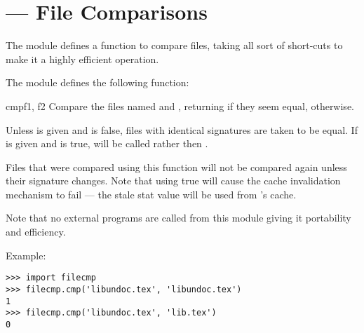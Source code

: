 \section{ ---
         File Comparisons}


The  module defines a function to compare files, taking all
sort of short-cuts to make it a highly efficient operation.

The  module defines the following function:

\begin{funcdesc}{cmp}{f1, f2}
Compare the files named  and , returning 
if they seem equal,  otherwise.

Unless  is given and is false, files with identical
 signatures are taken to be equal. If
 is given and is true,
 will be called rather then .

Files that were compared using this function will not be compared again
unless their  signature changes. Note that using
 true will cause the cache invalidation mechanism to 
fail --- the stale stat value will be used from 's 
cache.

Note that no external programs are called from this module giving it
portability and efficiency.
\end{funcdesc}

Example:

\begin{verbatim}
>>> import filecmp
>>> filecmp.cmp('libundoc.tex', 'libundoc.tex')
1
>>> filecmp.cmp('libundoc.tex', 'lib.tex')
0
\end{verbatim}
